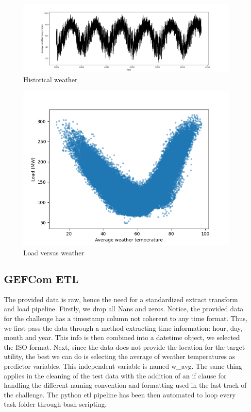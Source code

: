 \begin{figure}[!h]
    \includegraphics[width=\textwidth]{images/gefcom_w_avg_historical.png}
    \caption{Historical weather}
    \label{fig:gefcom_w_avg_historical}
\end{figure}

\begin{figure}[!h]
    \includegraphics[width=\textwidth]{images/gefcom_load_vs_w_avg.png}
    \caption{Load versus weather}
    \label{fig:gefcom_load_vs_w_avg}
\end{figure}

\subsection{GEFCom ETL}
The provided data is raw, hence the need for a standardized extract transform and load pipeline. 
Firstly, we drop all Nans and zeros. Notice, the provided data for the challenge has a timestamp column not coherent to any time format. Thus, we first pass the data through a method extracting time information: hour, day, month and year. This info is then combined into a datetime object, we selected the ISO format.
Next, since the data does not provide the location for the target utility, the best we can do is selecting the average of weather temperatures as predictor variables. This independent variable is named w\_avg.
The same thing applies in the cleaning of the test data with the addition of an if clause for handling the different naming convention and formatting used in the last track of the challenge. The python etl pipeline has been then automated to loop every task folder through bash scripting.


